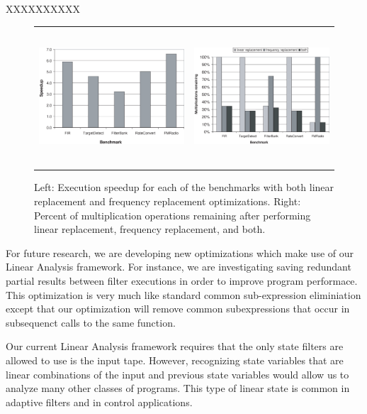 XXXXXXXXXX

\begin{figure}
  \center
  \begin{tabular}{cc}
    \includegraphics[height=2in]{cag-commit-streamit-linear-speedup.eps} &
    \includegraphics[height=2in]{cag-commit-streamit-linear-mults.eps} \\
  \end{tabular}
  \caption{
    Left: Execution speedup for each of the benchmarks with both linear 
    replacement and frequency replacement optimizations.
    Right: Percent of multiplication operations remaining after performing 
    linear replacement, frequency replacement, and both.
  }
  \label{fig:cag-commit-streamit-linear-speedup}
\end{figure}




For future research, we are developing new optimizations which make use
of our Linear Analysis framework. For instance, we are investigating saving
redundant partial results between filter executions in order to improve 
program performace. This optimization is very much like standard common
sub-expression eliminiation except that our optimization will remove common
subexpressions that occur in subsequenct calls to the same function.

Our current Linear Analysis framework requires that the only state
filters are allowed to use is the input tape. However, recognizing state
variables that are linear combinations of the input and previous state 
variables would allow us to analyze many other classes of programs. This
type of linear state is common in adaptive filters and in control 
applications.

